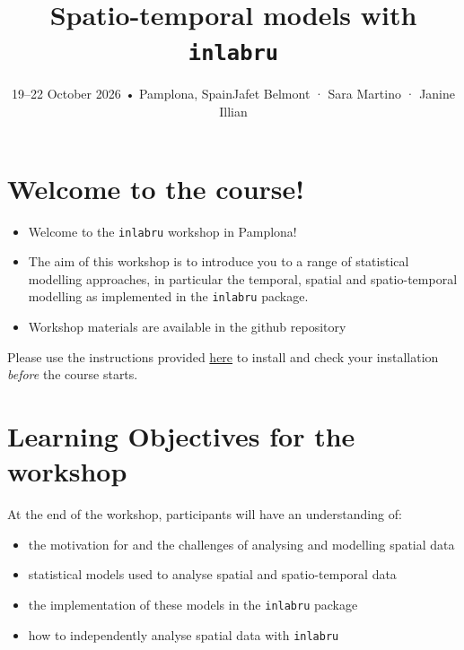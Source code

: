 \documentclass[
  letterpaper,
  DIV=11,
  numbers=noendperiod]{scrartcl}
\title{Spatio-temporal models with \texttt{inlabru}}
\subtitle{19--22 October 2026 • Pamplona, SpainJafet Belmont · Sara
Martino · Janine Illian}
\author{}
\date{}
\makeatletter
\providecommand{\tightlist}{%
  \setlength{\itemsep}{0pt}\setlength{\parskip}{0pt}}
\renewcommand{\maketitle}{\bgroup\setlength{\parindent}{0pt}
\begin{flushleft}
  {\sffamily\huge\textbf{\MakeUppercase{\@title}}} \vspace{0.3cm} \newline
  {\Large {\@subtitle}} \newline
  \@author
\end{flushleft}\egroup
}
\makeatother
\begin{document}
\maketitle

\pagestyle{mystyle}


\section{Welcome to the course!}\label{welcome-to-the-course}

\begin{itemize}
\tightlist
\item
  Welcome to the \texttt{inlabru} workshop in Pamplona!
\item
  The aim of this workshop is to introduce you to a range of statistical
  modelling approaches, in particular the temporal, spatial and
  spatio-temporal modelling as implemented in the \texttt{inlabru}
  package.
\item
  Workshop materials are available in the github repository
\end{itemize}

\begin{tcolorbox}[enhanced jigsaw, arc=.35mm, bottomrule=.15mm, bottomtitle=1mm, breakable, colback=white, colbacktitle=quarto-callout-warning-color!10!white, colframe=quarto-callout-warning-color-frame, coltitle=black, left=2mm, leftrule=.75mm, opacityback=0, opacitybacktitle=0.6, rightrule=.15mm, title=\textcolor{quarto-callout-warning-color}{\faExclamationTriangle}\hspace{0.5em}{Important! ⚠️}, titlerule=0mm, toprule=.15mm, toptitle=1mm]

Please use the instructions provided \href{Install_software.qmd}{here}
to install and check your installation \emph{before} the course starts.

\end{tcolorbox}

\section{Learning Objectives for the
workshop}\label{learning-objectives-for-the-workshop}

At the end of the workshop, participants will have an understanding of:

\begin{itemize}
\tightlist
\item
  the motivation for and the challenges of analysing and modelling
  spatial data
\item
  statistical models used to analyse spatial and spatio-temporal data
\item
  the implementation of these models in the \texttt{inlabru} package
\item
  how to independently analyse spatial data with \texttt{inlabru}
\end{itemize}
\end{document}
